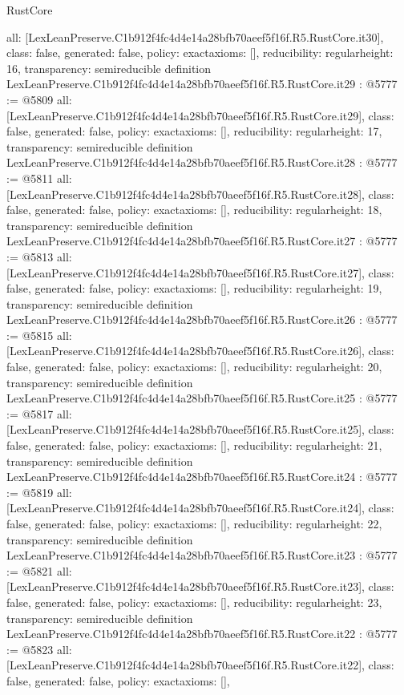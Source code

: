 \begin{lexlean}{RustCore}
\begin{coremodule}
{  all: [LexLeanPreserve.C1b912f4fc4d4e14a28bfb70aeef5f16f.R5.RustCore.it30],
  class: false,
  generated: false,
  policy: exact{axioms: []},
  reducibility: regular{height: 16},
  transparency: semireducible
}
definition LexLeanPreserve.C1b912f4fc4d4e14a28bfb70aeef5f16f.R5.RustCore.it29 : @5777 := @5809 {
  all: [LexLeanPreserve.C1b912f4fc4d4e14a28bfb70aeef5f16f.R5.RustCore.it29],
  class: false,
  generated: false,
  policy: exact{axioms: []},
  reducibility: regular{height: 17},
  transparency: semireducible
}
definition LexLeanPreserve.C1b912f4fc4d4e14a28bfb70aeef5f16f.R5.RustCore.it28 : @5777 := @5811 {
  all: [LexLeanPreserve.C1b912f4fc4d4e14a28bfb70aeef5f16f.R5.RustCore.it28],
  class: false,
  generated: false,
  policy: exact{axioms: []},
  reducibility: regular{height: 18},
  transparency: semireducible
}
definition LexLeanPreserve.C1b912f4fc4d4e14a28bfb70aeef5f16f.R5.RustCore.it27 : @5777 := @5813 {
  all: [LexLeanPreserve.C1b912f4fc4d4e14a28bfb70aeef5f16f.R5.RustCore.it27],
  class: false,
  generated: false,
  policy: exact{axioms: []},
  reducibility: regular{height: 19},
  transparency: semireducible
}
definition LexLeanPreserve.C1b912f4fc4d4e14a28bfb70aeef5f16f.R5.RustCore.it26 : @5777 := @5815 {
  all: [LexLeanPreserve.C1b912f4fc4d4e14a28bfb70aeef5f16f.R5.RustCore.it26],
  class: false,
  generated: false,
  policy: exact{axioms: []},
  reducibility: regular{height: 20},
  transparency: semireducible
}
definition LexLeanPreserve.C1b912f4fc4d4e14a28bfb70aeef5f16f.R5.RustCore.it25 : @5777 := @5817 {
  all: [LexLeanPreserve.C1b912f4fc4d4e14a28bfb70aeef5f16f.R5.RustCore.it25],
  class: false,
  generated: false,
  policy: exact{axioms: []},
  reducibility: regular{height: 21},
  transparency: semireducible
}
definition LexLeanPreserve.C1b912f4fc4d4e14a28bfb70aeef5f16f.R5.RustCore.it24 : @5777 := @5819 {
  all: [LexLeanPreserve.C1b912f4fc4d4e14a28bfb70aeef5f16f.R5.RustCore.it24],
  class: false,
  generated: false,
  policy: exact{axioms: []},
  reducibility: regular{height: 22},
  transparency: semireducible
}
definition LexLeanPreserve.C1b912f4fc4d4e14a28bfb70aeef5f16f.R5.RustCore.it23 : @5777 := @5821 {
  all: [LexLeanPreserve.C1b912f4fc4d4e14a28bfb70aeef5f16f.R5.RustCore.it23],
  class: false,
  generated: false,
  policy: exact{axioms: []},
  reducibility: regular{height: 23},
  transparency: semireducible
}
definition LexLeanPreserve.C1b912f4fc4d4e14a28bfb70aeef5f16f.R5.RustCore.it22 : @5777 := @5823 {
  all: [LexLeanPreserve.C1b912f4fc4d4e14a28bfb70aeef5f16f.R5.RustCore.it22],
  class: false,
  generated: false,
  policy: exact{axioms: []},
}
\end{coremodule}
\end{lexlean}
